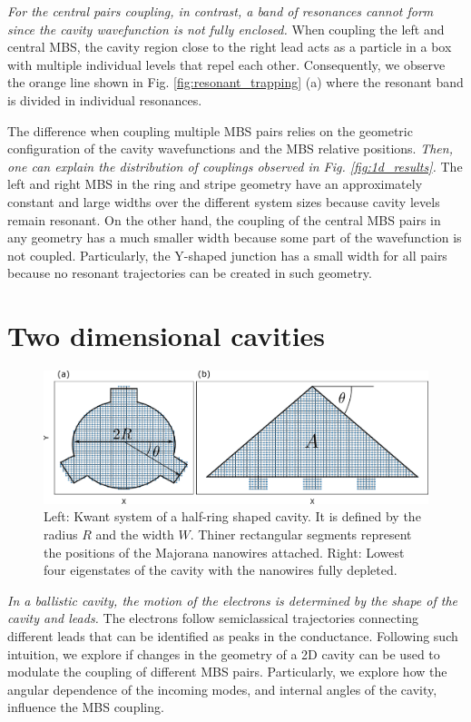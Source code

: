 \textit{For the central pairs coupling, in contrast, a band of resonances cannot form since the cavity wavefunction is not fully enclosed.}
When coupling the left and central MBS, the cavity region close to the right lead acts as a particle in a box with multiple individual levels that repel each other.
Consequently, we observe the orange line shown in Fig. \ref{fig:resonant_trapping} (a) where the resonant band is divided in individual resonances.

The difference when coupling multiple MBS pairs relies on the geometric configuration of the cavity wavefunctions and the MBS relative positions.
\textit{Then, one can explain the distribution of couplings observed in Fig. \ref{fig:1d_results}.}
The left and right MBS in the ring and stripe geometry have an approximately constant and large widths over the different system sizes because cavity levels remain resonant.
On the other hand, the coupling of the central MBS pairs in any geometry has a much smaller width because some part of the wavefunction is not coupled.
Particularly, the Y-shaped junction has a small width for all pairs because no resonant trajectories can be created in such geometry.

\section{Two dimensional cavities}

\begin{figure}[h!]
\centering
  \includegraphics[width=0.9\linewidth]{figures/2d_cavities.pdf}
  \caption{Left: Kwant system of a half-ring shaped cavity. It is defined by the radius $R$ and the width $W$. Thiner rectangular segments represent the positions of the Majorana nanowires attached. Right: Lowest four eigenstates of the cavity with the nanowires fully depleted.}
  \label{fig:2d}
\end{figure}

\textit{In a ballistic cavity, the motion of the electrons is determined by the shape of the cavity and leads.}
The electrons follow semiclassical trajectories connecting different leads that can be identified as peaks in the conductance.
Following such intuition, we explore if changes in the geometry of a 2D cavity can be used to modulate the coupling of different MBS pairs.
Particularly, we explore how the angular dependence of the incoming modes, and internal angles of the cavity, influence the MBS coupling.

